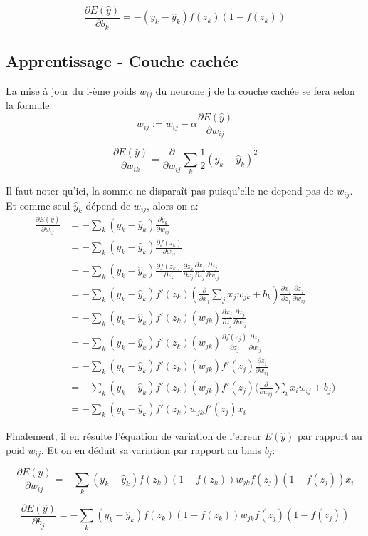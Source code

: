 \documentclass{article}
\begin{document}
$$\frac{\partial{E(\hat{y})}}{\partial{b_k}}=-(y_k-\hat{y}_k){f(z_k)(1-f(z_k))}$$

\subsection{Apprentissage - Couche cachée}

La mise à jour du i-ème poids $w_{ij}$ du neurone j de la couche cachée se fera selon la formule: 
\begin{equation}
w_{ij}:=w_{ij}-\alpha\frac{\partial{E(\hat{y})}}{\partial{w_{ij}}}
\end{equation}

\begin{equation}
\frac{\partial{E(\hat{y})}}{\partial{w_{ik}}}=\frac{\partial{}}{\partial{w_{ij}}}\sum_k{\frac{1}{2}(y_k-\hat{y}_k)^2}
\end{equation}

Il faut noter qu'ici, la somme ne disparaît pas puisqu'elle ne depend pas de $w_{ij}$. Et comme seul $\hat{y}_k$ dépend de $w_{ij}$, alors on a:
\begin{equation}
\begin{split}
\frac{\partial{E(\hat{y})}}{\partial{w_{ij}}}&=-\sum_k{(y_k-\hat{y}_k)\frac{\partial{\hat{y}_k}}{\partial{w_{ij}}}}\\
&=-\sum_k{(y_k-\hat{y}_k)\frac{\partial{f(z_k)}}{\partial{w_{ij}}}}\\
&=-\sum_k{(y_k-\hat{y}_k)\frac{\partial{f(z_k)}}{\partial{z_k}}\frac{\partial{z_k}}{\partial{x_j}}\frac{\partial{x_j}}{\partial{z_j}}\frac{\partial{z_j}}{\partial{w_{ij}}}}\\
&=-\sum_k{(y_k-\hat{y}_k){f'(z_k)}(\frac{\partial{}}{\partial{x_j}}\sum_j{{x_j}w_{jk}}+b_k)\frac{\partial{x_j}}{\partial{z_j}}\frac{\partial{z_j}}{\partial{w_{ij}}}}\\
&=-\sum_k{(y_k-\hat{y}_k){f'(z_k)}(w_{jk})\frac{\partial{x_j}}{\partial{z_j}}\frac{\partial{z_j}}{\partial{w_{ij}}}}\\
&=-\sum_k{(y_k-\hat{y}_k){f'(z_k)}(w_{jk})\frac{\partial{f(z_j)}}{\partial{z_j}}\frac{\partial{z_j}}{\partial{w_{ij}}}}\\
&=-\sum_k{(y_k-\hat{y}_k){f'(z_k)}(w_{jk}){f'(z_j)}\frac{\partial{z_j}}{\partial{w_{ij}}}}\\
&=-\sum_k{(y_k-\hat{y}_k){f'(z_k)}(w_{jk}){f'(z_j)}(\frac{\partial{}}{\partial{w_{ij}}}}\sum_i{{x_i}w_{ij}}+b_j)\\
&=-\sum_k{(y_k-\hat{y}_k){f'(z_k)}w_{jk}{f'(z_j)}x_i}
\end{split}
\end{equation}

Finalement, il en résulte l'équation de variation de l'erreur $E(\hat{y})$ par rapport au poid $w_{ij}$. Et on en déduit sa variation par rapport au biais $b_j$:

$$\frac{\partial{E(\hat{y})}}{\partial{w_{ij}}}=-\sum_k{(y_k-\hat{y}_k){f(z_k)(1-f(z_k))}w_{jk}{f(z_j)(1-f(z_j))}x_i}$$

$$\frac{\partial{E(\hat{y})}}{\partial{b_j}}=-\sum_k{(y_k-\hat{y}_k){f(z_k)(1-f(z_k))}w_{jk}{f(z_j)(1-f(z_j))}}$$
\end{document}
